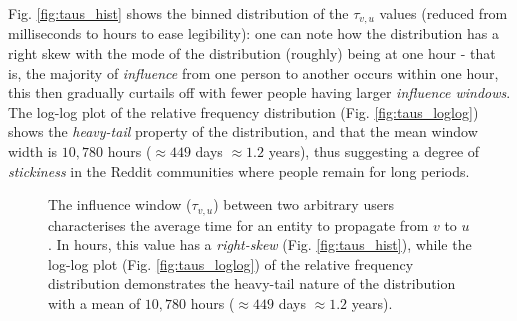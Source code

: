\documentclass[journal,10pt,draftclsnofoot,onecolumn]{IEEEtran}
\begin{document}
Fig. \ref{fig:taus_hist} shows the binned distribution of the $\tau_{v,u}$ values (reduced from milliseconds to hours to ease legibility): one can note how the distribution has a right skew with the mode of the distribution (roughly) being at one hour - that is, the majority of \emph{influence} from one person to another occurs within one hour, this then gradually curtails off with fewer people having larger \emph{influence windows}.
The log-log plot of the relative frequency distribution (Fig. \ref{fig:taus_loglog}) shows the \emph{heavy-tail} property of the distribution, and that the mean window width is $10,780$ hours ($\approx 449$ days $\approx 1.2$ years), thus suggesting a degree of \emph{stickiness} in the Reddit communities where people remain for long periods.


\begin{figure}[ht!]
  \begin{center}
  \end{center}    
  \caption{The influence window ($\tau_{v,u}$) between two arbitrary users characterises the average time for an entity to propagate from $v$ to $u$. In hours, this value has a \emph{right-skew} (Fig. \ref{fig:taus_hist}), while the log-log plot (Fig. \ref{fig:taus_loglog}) of the relative frequency distribution demonstrates the heavy-tail nature of the distribution with a mean of $10,780$ hours ($\approx 449$ days $\approx 1.2$ years).}
  \label{fig:taus}
\end{figure}
\end{document}
